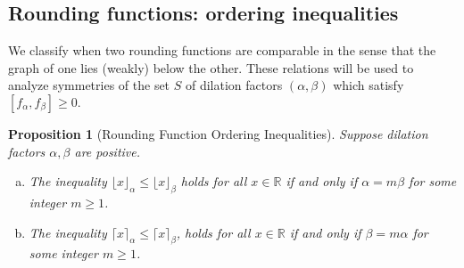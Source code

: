 \documentclass[11pt, letterpaper, reqno]{amsart}
\newtheorem{prop}[thm]{Proposition}
\theoremstyle{definition}
\newtheorem{rmk}[thm]{Remark}
\numberwithin{equation}{section}
\newcommand{\RR}{\ensuremath{\mathbb{R}}}
\newcommand{\floor}[1]{\lfloor{#1}\rfloor}
\newcommand{\ceil}[1]{\lceil{#1}\rceil}
\begin{document}

\subsection{Rounding functions: ordering inequalities} 

We  classify when two rounding functions are comparable 
in the sense that the graph of one lies (weakly) below the other.
These relations will be used to analyze  symmetries of the set $S$ of dilation factors 
$(\alpha,\beta)$ which satisfy ${ [f_\alpha,f_\beta]\geq 0.}$

\begin{prop}[Rounding Function Ordering Inequalities]
\label{prop:rounding-relations}
Suppose dilation factors $\alpha,\beta $ are positive. 
\begin{enumerate}[(a)]
\item 
The inequality $\floor{x}_\alpha \leq \floor{x}_\beta$ holds for all $x\in\RR$ if and only 
if $\alpha = m\beta$ for some integer $m\geq 1$.
\item
The inequality $\ceil{x}_\alpha \leq \ceil{x}_\beta$, 
holds for all $x\in\RR$ 
if and only if $\beta = m\alpha$ for some integer $m\geq 1$.
\end{enumerate}
\end{prop}

\end{document}
